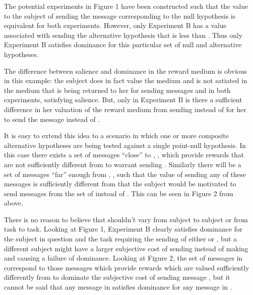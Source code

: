 The potential experiments in Figure 1 have been constructed such that the value to the subject of sending the message corresponding to the null hypothesis is equivalent for both experiments.
However, only Experiment B has a value associated with sending the alternative hypothesis that is less than .
Thus only Experiment B satisfies dominance for this particular set of null and alternative hypotheses.

The difference between salience and dominance in the reward medium is obvious in this example: the subject does in fact value the medium and is not satiated in the medium that is being returned to her for sending messages  and  in both experiments, satisfying salience.
But, only in Experiment B is there a sufficient difference in her valuation of the reward medium from sending  instead of   for her to send the message  instead of .


It is easy to extend this idea to a scenario in which one or more composite alternative hypotheses are being tested against a single point-null hypothesis.
In this case there exists a set of messages \enquote{close} to , , which provide rewards that are not sufficiently different from  to warrant sending .
Similarly there will be a set of messages \enquote{far} enough from , , such that the value of sending any of these messages is sufficiently different from  that the subject would be motivated to send messages from the set of  instead of .
This can be seen in Figure 2 from \textcite{Harrison1992} above.

There is no reason to believe that  shouldn't vary from subject to subject or from task to task.
Looking at Figure 1, Experiment B clearly satisfies dominance for the subject in question and the task requiring the sending of either  or , but a different subject might have a larger subjective cost of sending  instead of  making  and causing a failure of dominance.
Looking at Figure 2, the set of messages in  correspond to those messages which provide rewards which are valued sufficiently differently from  to dominate the subjective cost of sending message , but it cannot be said that any message in  satisfies dominance for any message in .


